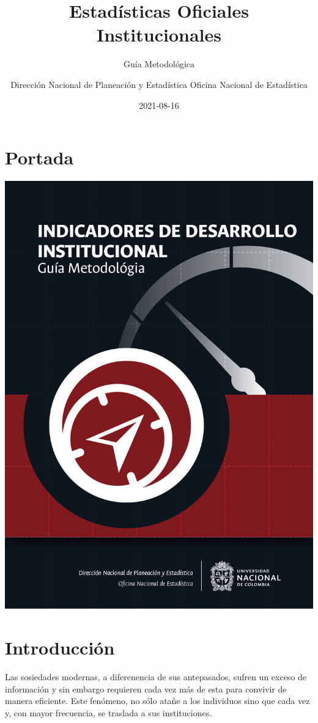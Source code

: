 \documentclass[
]{book}
\title{Estadísticas Oficiales Institucionales}
\subtitle{Guía Metodológica}
\author{Dirección Nacional de Planeación y Estadística Oficina Nacional de Estadística}
\date{2021-08-16}
\begin{document}
\maketitle

{
\setcounter{tocdepth}{1}
\tableofcontents
}
\hypertarget{portada}{%
\chapter*{Portada}\label{portada}}

\begin{center}\includegraphics[width=0.75\linewidth,]{imagenes/Portada} \end{center}

\hypertarget{intro}{%
\chapter{\texorpdfstring{\textbf{Introducción}}{Introducción}}\label{intro}}

Las sosiedades modernas, a diferenencia de sus antepasados, sufren un exceso de información y sin embargo requieren cada vez más de esta para convivir de manera eficiente. Este fenómeno, no sólo atañe a los individuos sino que cada vez y, con mayor frecuencia, se traslada a sus instituciones.
\end{document}
